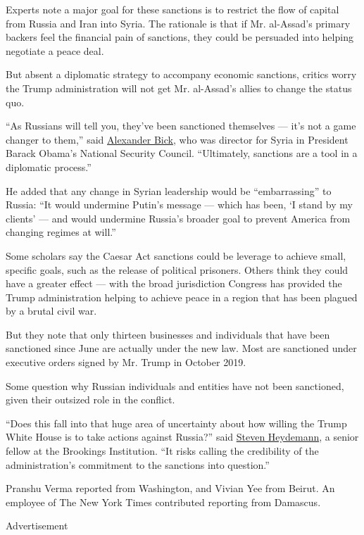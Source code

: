 Experts note a major goal for these sanctions is to restrict the flow of
capital from Russia and Iran into Syria. The rationale is that if Mr.
al-Assad's primary backers feel the financial pain of sanctions, they
could be persuaded into helping negotiate a peace deal.

But absent a diplomatic strategy to accompany economic sanctions,
critics worry the Trump administration will not get Mr. al-Assad's
allies to change the status quo.

``As Russians will tell you, they've been sanctioned themselves --- it's
not a game changer to them,'' said
\href{https://www.wilsoncenter.org/person/alexander-bick}{Alexander
Bick}, who was director for Syria in President Barack Obama's National
Security Council. ``Ultimately, sanctions are a tool in a diplomatic
process.''

He added that any change in Syrian leadership would be ``embarrassing''
to Russia: ``It would undermine Putin's message --- which has been, `I
stand by my clients' --- and would undermine Russia's broader goal to
prevent America from changing regimes at will.''

Some scholars say the Caesar Act sanctions could be leverage to achieve
small, specific goals, such as the release of political prisoners.
Others think they could have a greater effect --- with the broad
jurisdiction Congress has provided the Trump administration helping to
achieve peace in a region that has been plagued by a brutal civil war.

But they note that only thirteen businesses and individuals that have
been sanctioned since June are actually under the new law. Most are
sanctioned under executive orders signed by Mr. Trump in October 2019.

Some question why Russian individuals and entities have not been
sanctioned, given their outsized role in the conflict.

``Does this fall into that huge area of uncertainty about how willing
the Trump White House is to take actions against Russia?'' said
\href{https://www.brookings.edu/experts/steven-heydemann/}{Steven
Heydemann}, a senior fellow at the Brookings Institution. ``It risks
calling the credibility of the administration's commitment to the
sanctions into question.''

Pranshu Verma reported from Washington, and Vivian Yee from Beirut. An
employee of The New York Times contributed reporting from Damascus.

Advertisement

